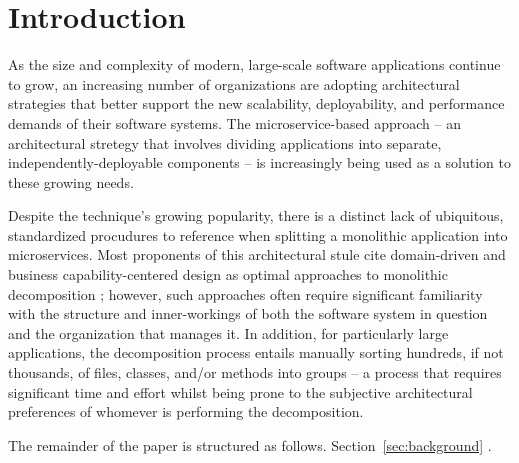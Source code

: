 \section{Introduction}
\label{sec:intro}


As the size and complexity of modern, large-scale software applications continue to grow, an increasing number of organizations are adopting architectural strategies that better support the new scalability, deployability, and performance demands of their software systems. The microservice-based approach -- an architectural stretegy that involves dividing applications into separate, independently-deployable components -- is increasingly being used as a solution to these growing needs. 



Despite the technique's growing popularity, there is a distinct lack of ubiquitous, standardized procudures to reference when splitting a monolithic application into microservices. Most proponents of this architectural stule cite domain-driven and business capability-centered design as optimal approaches to monolithic decomposition  ; however, such approaches often require significant familiarity with the structure and inner-workings of both the software system in question and the organization that manages it. In addition, for particularly large applications, the decomposition process entails manually sorting hundreds, if not thousands, of files, classes, and/or methods into groups -- a process that requires significant time and effort whilst being prone to the subjective architectural preferences of whomever is performing the decomposition. 






The remainder of the paper is structured as follows. Section~\ref{sec:background}  . 

